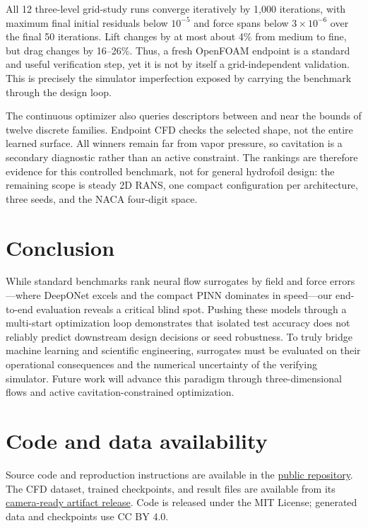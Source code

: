 \documentclass{article}
\begin{document}
All 12 three-level grid-study runs converge iteratively by 1,000 iterations,
with maximum final initial residuals below $10^{-5}$ and force spans below
$3\times10^{-6}$ over the final 50 iterations. Lift changes by at
most about 4\% from medium to fine, but drag changes by 16--26\%. Thus, a fresh
OpenFOAM endpoint is a standard and useful verification step, yet it is not by
itself a grid-independent validation. This is precisely the simulator
imperfection exposed by carrying the benchmark through the design loop.

The continuous optimizer also queries descriptors between and near the bounds
of twelve discrete families. Endpoint CFD checks the selected shape, not the
entire learned surface. All winners remain far from vapor pressure, so
cavitation is a secondary diagnostic rather than an active constraint. The
rankings are therefore evidence for this controlled benchmark, not for general
hydrofoil design: the remaining scope is steady 2D RANS, one compact
configuration per architecture, three seeds, and the NACA four-digit space.

\section{Conclusion}
While standard benchmarks rank neural flow surrogates by field and force errors---where DeepONet excels and the compact PINN dominates in speed---our end-to-end evaluation reveals a critical blind spot. Pushing these models through a multi-start optimization loop demonstrates that isolated test accuracy does not reliably predict downstream design decisions or seed robustness. To truly bridge machine learning and scientific engineering, surrogates must be evaluated on their operational consequences and the numerical uncertainty of the verifying simulator. Future work will advance this paradigm through three-dimensional flows and active cavitation-constrained optimization.




\appendix
\section{Code and data availability}
Source code and reproduction instructions are available in the
\href{https://github.com/aaravvd/hydrofoil-neural-surrogates}{public repository}.
The CFD dataset, trained checkpoints, and result files are available from its
\href{https://github.com/aaravvd/hydrofoil-neural-surrogates/releases/tag/sim2science2026-camera-ready}{camera-ready artifact release}.
Code is released under the MIT License; generated data and checkpoints use CC BY 4.0.
\end{document}
